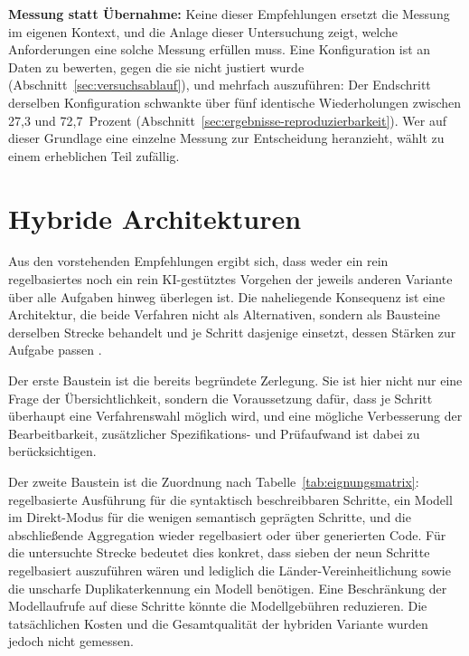 \noindent\textbf{Messung statt Übernahme:} Keine dieser Empfehlungen ersetzt die Messung im eigenen Kontext, und die Anlage dieser Untersuchung zeigt, welche Anforderungen eine solche Messung erfüllen muss. Eine Konfiguration ist an Daten zu bewerten, gegen die sie nicht justiert wurde (Abschnitt~\ref{sec:versuchsablauf}), und mehrfach auszuführen: Der Endschritt derselben Konfiguration schwankte über fünf identische Wiederholungen zwischen 27,3 und 72,7~Prozent (Abschnitt~\ref{sec:ergebnisse-reproduzierbarkeit}). Wer auf dieser Grundlage eine einzelne Messung zur Entscheidung heranzieht, wählt zu einem erheblichen Teil zufällig.

\section{Hybride Architekturen}
\label{sec:hybride-architekturen}

Aus den vorstehenden Empfehlungen ergibt sich, dass weder ein rein regelbasiertes noch ein rein \ac{KI}-gestütztes Vorgehen der jeweils anderen Variante über alle Aufgaben hinweg überlegen ist. Die naheliegende Konsequenz ist eine Architektur, die beide Verfahren nicht als Alternativen, sondern als Bausteine derselben Strecke behandelt und je Schritt dasjenige einsetzt, dessen Stärken zur Aufgabe passen \autocite{coteDataCleaningMachine2024,kasireddyRoleAIModern2026}.

Der erste Baustein ist die bereits begründete Zerlegung. Sie ist hier nicht nur eine Frage der Übersichtlichkeit, sondern die Voraussetzung dafür, dass je Schritt überhaupt eine Verfahrenswahl möglich wird, und eine mögliche Verbesserung der Bearbeitbarkeit, zusätzlicher Spezifikations- und Prüfaufwand ist dabei zu berücksichtigen.

Der zweite Baustein ist die Zuordnung nach Tabelle~\ref{tab:eignungsmatrix}: regelbasierte Ausführung für die syntaktisch beschreibbaren Schritte, ein Modell im Direkt-Modus für die wenigen semantisch geprägten Schritte, und die abschließende Aggregation wieder regelbasiert oder über generierten Code. Für die untersuchte Strecke bedeutet dies konkret, dass sieben der neun Schritte regelbasiert auszuführen wären und lediglich die Länder-Vereinheitlichung sowie die unscharfe Duplikaterkennung ein Modell benötigen. Eine Beschränkung der Modellaufrufe auf diese Schritte könnte die Modellgebühren reduzieren. Die tatsächlichen Kosten und die Gesamtqualität der hybriden Variante wurden jedoch nicht gemessen.

